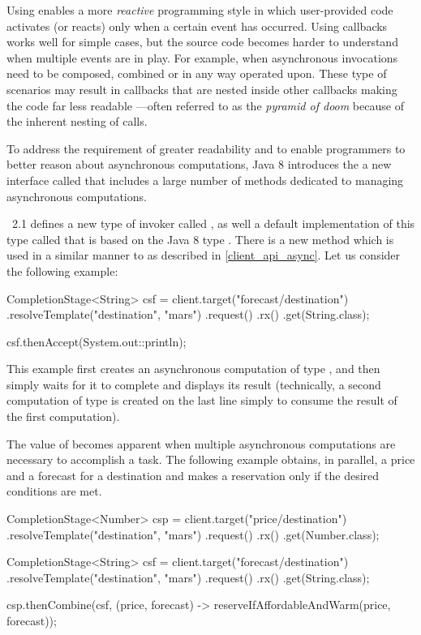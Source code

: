Using  enables a more \emph{reactive} programming style in which user-provided code activates (or reacts) only when a certain event has occurred. Using callbacks works well for simple cases, but the source code becomes harder to understand when multiple events are in play. For example, when asynchronous invocations need to be composed, combined or in any way operated upon. These type of scenarios may result in callbacks that are nested inside other callbacks making the code far less readable ---often referred to as the \emph{pyramid of doom} because of the inherent nesting of calls.

To address the requirement of greater readability and to enable programmers to better reason about asynchronous computations, Java 8 introduces the a new interface called  that includes a large number of methods dedicated to managing asynchronous computations. 

\jaxrs\ 2.1 defines a new type of invoker called , as well a default implementation of this type called  that is based on the Java 8 type . There is a new  method which is used in a similar manner to  as described in \ref{client_api_async}. Let us consider the following example:

\begin{listing}{1}
CompletionStage<String> csf = client.target("forecast/{destination}")
    .resolveTemplate("destination", "mars")
    .request()
    .rx()
    .get(String.class);

csf.thenAccept(System.out::println);
\end{listing}

This example first creates an asynchronous computation of type , and then simply waits for it to complete and displays its result (technically, a second computation of type  is created on the last line simply to consume the result of the first computation). 

The value of  becomes apparent when multiple asynchronous computations are necessary to accomplish a task. The following example obtains, in parallel, a price and a forecast for a destination and makes a reservation only if the desired conditions are met. 

\begin{listing}{1}
CompletionStage<Number> csp = client.target("price/{destination}")
    .resolveTemplate("destination", "mars")
    .request()
    .rx()
    .get(Number.class);

CompletionStage<String> csf = client.target("forecast/{destination}")
    .resolveTemplate("destination", "mars")
    .request()
    .rx()
    .get(String.class);
	
csp.thenCombine(csf, (price, forecast) -> 
    reserveIfAffordableAndWarm(price, forecast));
\end{listing}

